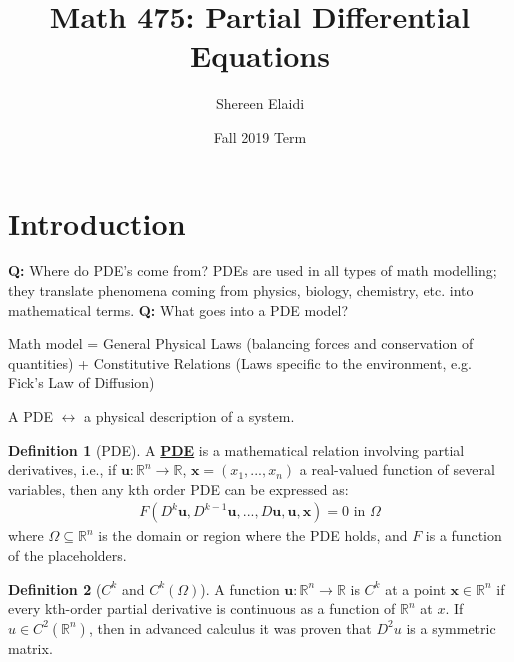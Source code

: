 \documentclass[11pt]{scrartcl}
\title{\textbf{Math 475: Partial Differential Equations}}
\author{Shereen Elaidi}
\date{Fall 2019 Term}
\newcommand{\R}[0]{\mathbb{R}}
\theoremstyle{definition}
\newtheorem{definition}{Definition}
\theoremstyle{remark}
\newcommand{\dfn}[1]{\textbf{\underline{#1}}}
\newcommand{\vect}[1]{\mathbf{#1}}
\begin{document}
\maketitle
\tableofcontents

\section{Introduction}

\textbf{Q:} Where do PDE's come from? PDEs are used in all types of math modelling; they translate phenomena coming from physics, biology, chemistry, etc. into mathematical terms. 
\newline 
\newline 
\textbf{Q:} What goes into a PDE model? 
\begin{center}
	Math model = General Physical Laws (balancing forces and conservation of quantities) + Constitutive Relations (Laws specific to the environment, e.g. Fick's Law of Diffusion) 
\end{center}
A PDE $\leftrightarrow$ a physical description of a system. 

\begin{definition}[PDE]
	A \dfn{PDE} is a mathematical relation involving partial derivatives, i.e., if $\vect{u}: \R^n \rightarrow \R$, $\vect{x} = (x_1, ..., x_n)$ a real-valued function of several variables, then any kth order PDE can be expressed as: 
	\begin{align}
		F(D^k \vect{u}, D^{k-1} \vect{u}, ..., D \vect{u}, \vect{u}, \vect{x} ) = 0 \text{ in } \Omega 	
	\end{align}
	where $\Omega \subseteq \R^n$ is the domain or region where the PDE holds, and $F$ is a function of the placeholders. 
\end{definition}

\begin{definition}[$C^k$ and $C^k(\Omega)$] A function $\vect{u}: \R^n \rightarrow \R$ is $C^k$ at a point $\vect{x} \in \R^n$ if every kth-order partial derivative is continuous as a function of $\R^n$ at $x$. If $u \in C^2(\R^n)$, then in advanced calculus it was proven that $D^2u$ is a symmetric matrix. 
\end{definition}
\end{document}

